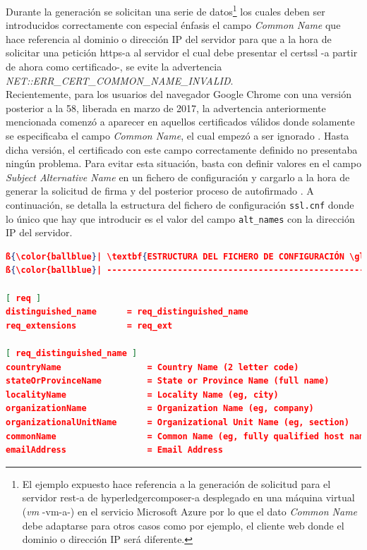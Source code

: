\documentclass[12pt,a4paper, twoside]{report}
\begin{document}
\begin{enumerate}
		Durante la generación se solicitan una serie de datos\footnote{El ejemplo expuesto hace referencia a la generación de solicitud para el servidor \gls{rest-a} de \gls{hyperledgercomposer-a} desplegado en una máquina virtual (\textit{\gls{vm}} -\gls{vm-a}-) en el servicio Microsoft Azure por lo que el dato \textit{Common Name} debe adaptarse para otros casos como por ejemplo, el cliente web donde el dominio o dirección IP será diferente.} los cuales deben ser introducidos correctamente con especial énfasis el campo \textit{Common Name} que hace referencia al dominio o dirección IP del servidor para que a la hora de solicitar una petición \gls{https-a} al servidor el cual debe presentar el \gls{certssl} -a partir de ahora como certificado-, se evite la advertencia \textit{NET::ERR\_CERT\_COMMON\_NAME\_INVALID}. \\
		
		Recientemente, para los usuarios del navegador Google Chrome con una versión posterior a la 58, liberada en marzo de 2017, la advertencia anteriormente mencionada comenzó a aparecer en aquellos certificados válidos donde solamente se especificaba el campo \textit{Common Name}, el cual empezó a ser ignorado \cite{stackoverflow:SSLC}. Hasta dicha versión, el certificado con este campo correctamente definido no presentaba ningún problema. Para evitar esta situación, basta con definir valores en el campo \textit{Subject Alternative Name} en un fichero de configuración y cargarlo a la hora de generar la solicitud de firma y del posterior proceso de autofirmado \cite{croxton:SAN}. A continuación, se detalla la estructura del fichero de configuración \texttt{ssl.cnf} donde lo único que hay que introducir es el valor del campo \texttt{alt\_names} con la dirección IP del servidor. \\
		
\begin{lstlisting}[language=json, basicstyle=\ttfamily\footnotesize, numbers=none, escapechar=ß]
ß{\color{ballblue}| \textbf{ESTRUCTURA DEL FICHERO DE CONFIGURACIÓN \gls{ssl-a} - SSL.CNF}}ß
ß{\color{ballblue}| -----------------------------------------------------}ß

[ req ]
distinguished_name 	    = req_distinguished_name
req_extensions     	    = req_ext

[ req_distinguished_name ]
countryName                 = Country Name (2 letter code)
stateOrProvinceName         = State or Province Name (full name)
localityName                = Locality Name (eg, city)
organizationName            = Organization Name (eg, company)
organizationalUnitName 	    = Organizational Unit Name (eg, section)
commonName                  = Common Name (eg, fully qualified host name)
emailAddress                = Email Address


\end{lstlisting}
\end{enumerate}
\end{document}
